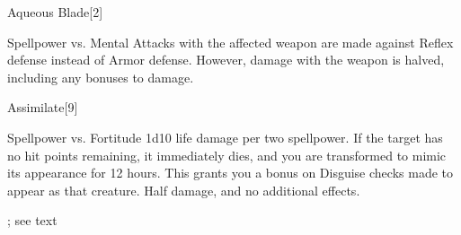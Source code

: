 \begin{spellsection}{Aqueous Blade}[2]
    \begin{spellheader}
    \end{spellheader}
    \begin{spellcontent}
        \begin{spelltargetinginfo}
        \end{spelltargetinginfo}
        \begin{spelleffects}
            \begin{spellattack}{Spellpower vs. Mental}
                \spellsuccess Attacks with the affected weapon are made against Reflex defense instead of Armor defense. However, damage with the weapon is halved, including any bonuses to damage.
            \end{spellattack}
            \spelldur \durshort
        \end{spelleffects}
    \end{spellcontent}
    \begin{spellfooter}
        \miscastrandom
    \end{spellfooter}
\end{spellsection}

\begin{spellsection}{Assimilate}[9]
    \begin{spellheader}
    \end{spellheader}
    \begin{spellcontent}
        \begin{spelltargetinginfo}
        \end{spelltargetinginfo}
        \begin{spelleffects}
            \begin{spellattack}{Spellpower vs. Fortitude}
                \spellsuccess 1d10 life damage per two spellpower. If the target has no hit points remaining, it immediately dies, and you are transformed to mimic its appearance for 12 hours. This grants you a  bonus on Disguise checks made to appear as that creature.
                \spellfailure Half damage, and no additional effects.
            \end{spellattack}
            \spelldur \durext; see text
        \end{spelleffects}
    \end{spellcontent}
    \begin{spellfooter}
        \miscastrandom
    \end{spellfooter}
\end{spellsection}

